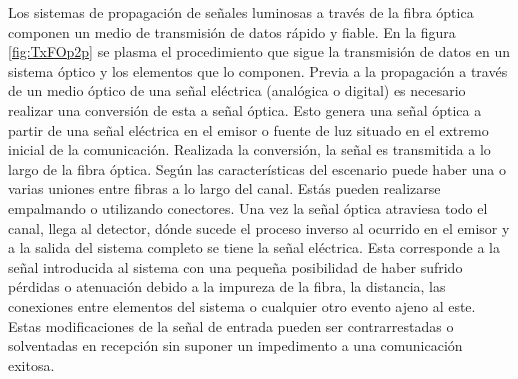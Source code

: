  Los sistemas de propagación de señales luminosas a través de la fibra óptica componen un medio de transmisión de datos rápido y fiable. En la figura \ref{fig:TxFOp2p} se plasma el procedimiento que sigue la transmisión de datos en un sistema óptico y los elementos que lo componen. Previa a la propagación a través de un medio óptico de una señal eléctrica (analógica o digital) es necesario realizar una conversión de esta a señal óptica. Esto genera una señal óptica a partir de una señal eléctrica en el emisor o fuente de luz situado en el extremo inicial de la comunicación. Realizada la conversión, la señal es transmitida a lo largo de la fibra óptica. Según las características del escenario puede haber una o varias uniones entre fibras a lo largo del canal. Estás pueden realizarse empalmando o utilizando conectores. Una vez la señal óptica atraviesa todo el canal, llega al detector, dónde sucede el proceso inverso al ocurrido en el emisor y a la salida del sistema completo se tiene la señal eléctrica. Esta corresponde a la señal introducida al sistema con una pequeña posibilidad de haber sufrido pérdidas o atenuación debido a la impureza de la fibra, la distancia, las conexiones entre elementos del sistema o cualquier otro evento ajeno al este. Estas modificaciones de la señal de entrada pueden ser contrarrestadas o solventadas en recepción sin suponer un impedimento a una comunicación exitosa.    
  
